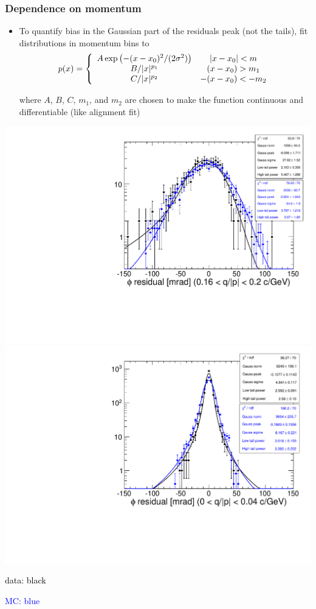 \documentclass[compress]{beamer}
\begin{document}
\begin{frame}
\frametitle{Dependence on momentum}

\vspace{-1.8 cm}
\begin{itemize}
\item To quantify bias in the Gaussian part of the residuals peak (not
  the tails), fit distributions in momentum bins to
\[ p(x) = \left\{ \begin{array}{c c}
A \exp\left(-(x - x_0)^2/(2\sigma^2)\right) & |x - x_0| < m \\
B/|x|^{p_1} & (x - x_0) > m_1 \\
C/|x|^{p_2} & -(x - x_0) < -m_2 \\
\end{array} \right. \]

where $A$, $B$, $C$, $m_1$, and $m_2$ are chosen to make the function
continuous and differentiable (like alignment fit)
\end{itemize}

\includegraphics[width=0.49\linewidth]{example_lowmomentum.pdf}
\includegraphics[width=0.49\linewidth]{example_highmomentum.pdf}

\vspace{-3.6 cm}
\hspace{6.3 cm}\textcolor{black}{data: black}

\hspace{6.3 cm}\textcolor{blue}{MC: blue}
\end{frame}
\end{document}
